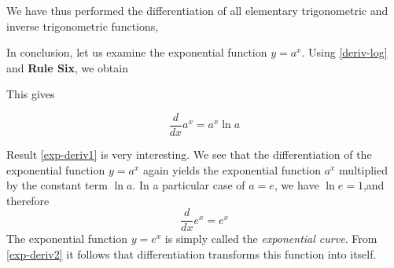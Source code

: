 We have thus performed the differentiation of all elementary trigonometric and inverse trigonometric functions,

 In conclusion, let us examine the exponential function $y = a^{x}$. Using \eqref{deriv-log} and \textbf{Rule Six}, we obtain
 
 This gives

\begin{equation}%
\boxed{\frac{d}{dx} a^{x} =  a^{x} \ln a}
\label{exp-deriv1}
\end{equation}

Result \eqref{exp-deriv1} is very interesting. We see that the differentiation of the exponential function $y = a^{x}$ again yields the exponential function $a^{x}$ multiplied by the constant term $\ln a$. In a particular case of $a= e$, we have $\ln e= 1$,and therefore
\begin{equation}%
\boxed{\frac{d}{dx} e^{x} = e^{x}}
\label{exp-deriv2}
\end{equation}
The exponential function $y = e^{x}$ is simply called the \emph{exponential curve}. From \eqref{exp-deriv2} it follows that differentiation transforms this function into itself.